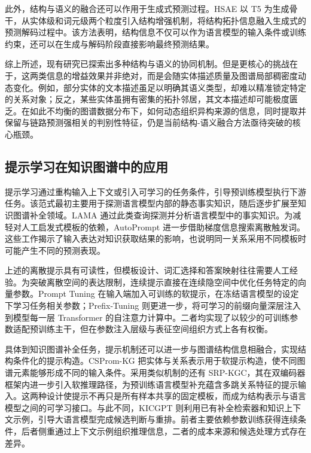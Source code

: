此外，结构与语义的融合还可以作用于生成式预测过程。HSAE 以 T5 为生成骨干，从实体级和词元级两个粒度引入结构增强机制，将结构拓扑信息融入生成式的预测解码过程中\cite{xue2025hsae}。该方法表明，结构信息不仅可以作为语言模型的输入条件或训练约束，还可以在生成与解码阶段直接影响最终预测结果。

综上所述，现有研究已探索出多种结构与语义的协同机制。但是更核心的挑战在于，这两类信息的增益效果并非绝对，而是会随实体描述质量及图谱局部稠密度动态变化。例如，部分实体的文本描述虽足以明确其语义类型，却难以精准锁定特定的关系对象；反之，某些实体虽拥有密集的拓扑邻居，其文本描述却可能极度匮乏。在如此不均衡的图谱数据分布下，如何动态组织异构来源的信息，同时提取并保留与链路预测强相关的判别性特征，仍是当前结构-语义融合方法亟待突破的核心瓶颈。

\subsection{提示学习在知识图谱中的应用}

提示学习通过重构输入上下文或引入可学习的任务条件，引导预训练模型执行下游任务。该范式最初主要用于探测语言模型内部的静态事实知识，随后逐步扩展至知识图谱补全领域。LAMA 通过此类查询探测并分析语言模型中的事实知识\cite{petroni2019language}。为减轻对人工启发式模板的依赖，AutoPrompt 进一步借助梯度信息搜索离散触发词\cite{AutoPrompt_Shin_2020}。这些工作揭示了输入表达对知识获取结果的影响，也说明同一关系采用不同模板时可能产生不同的预测表现。

上述的离散提示具有可读性，但模板设计、词汇选择和答案映射往往需要人工经验。为突破离散空间的表达限制，连续提示直接在连续隐空间中优化任务特定的向量参数。Prompt Tuning 在输入端加入可训练的软提示，在冻结语言模型的设定下学习任务相关参数\cite{lester2021power}；Prefix-Tuning 则更进一步，将可学习的前缀向量深层注入到模型每一层 Transformer 的自注意力计算中\cite{PrefixTuning_Li_2021}。二者均实现了以较少的可训练参数适配预训练主干，但在参数注入层级与表征空间组织方式上各有权衡。

具体到知识图谱补全任务，提示机制还可以进一步与图谱结构信息相融合，实现结构条件化的提示构造。CSProm-KG 把实体与关系表示用于软提示构造，使不同图谱元素能够形成不同的输入条件\cite{chen2023cspromkg}。采用类似机制的还有 SRP-KGC，其在双编码器框架内进一步引入软推理路径，为预训练语言模型补充蕴含多跳关系特征的提示输入\cite{hou2025srpkgc}。这两种设计使提示不再只是所有样本共享的固定模板，而成为结构表示与语言模型之间的可学习接口。与此不同，KICGPT 则利用已有补全检索器和知识上下文示例，引导大语言模型完成候选判断与重排\cite{wei2023kicgpt}。前者主要依赖参数训练获得连续条件，后者侧重通过上下文示例组织推理信息，二者的成本来源和候选处理方式存在差异。

